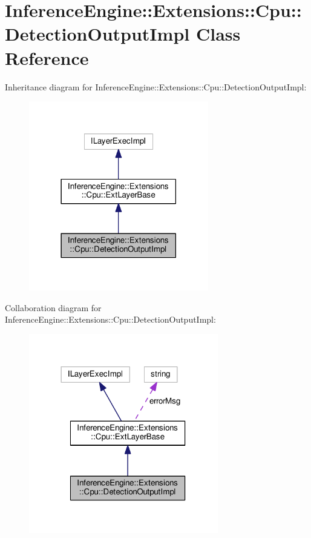 \hypertarget{classInferenceEngine_1_1Extensions_1_1Cpu_1_1DetectionOutputImpl}{}\section{Inference\+Engine\+:\+:Extensions\+:\+:Cpu\+:\+:Detection\+Output\+Impl Class Reference}
\label{classInferenceEngine_1_1Extensions_1_1Cpu_1_1DetectionOutputImpl}


Inheritance diagram for Inference\+Engine\+:\+:Extensions\+:\+:Cpu\+:\+:Detection\+Output\+Impl\+:
\nopagebreak
\begin{figure}[H]
\begin{center}
\leavevmode
\includegraphics[width=222pt]{classInferenceEngine_1_1Extensions_1_1Cpu_1_1DetectionOutputImpl__inherit__graph}
\end{center}
\end{figure}


Collaboration diagram for Inference\+Engine\+:\+:Extensions\+:\+:Cpu\+:\+:Detection\+Output\+Impl\+:
\nopagebreak
\begin{figure}[H]
\begin{center}
\leavevmode
\includegraphics[width=234pt]{classInferenceEngine_1_1Extensions_1_1Cpu_1_1DetectionOutputImpl__coll__graph}
\end{center}
\end{figure}
